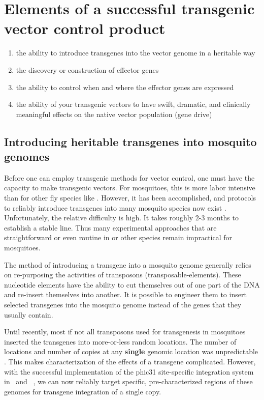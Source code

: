 \section{Elements of a successful transgenic vector control product}

\begin{enumerate}
  \item the ability to introduce transgenes into the vector genome in a heritable way
  \item the discovery or construction of effector genes
  \item the ability to control when and where the effector genes are expressed
  \item the ability of your transgenic vectors to have swift, dramatic, and clinically meaningful effects on the native vector population (gene drive)
\end{enumerate}



\subsection{Introducing heritable transgenes into mosquito genomes}

Before one can employ transgenic methods for vector control, one must have the capacity to make transgenic vectors.
For mosquitoes, this is more labor intensive than for other fly species like \Dmel.
However, it has been accomplished, and protocols to reliably introduce transgenes into many mosquito species now exist \CITEME.
Unfortunately, the relative difficulty is high.
It takes roughly 2-3 months to establish a stable line.
Thus many experimental approaches that are straightforward or even routine in \Dm or other species remain impractical for mosquitoes.

The method of introducing a \gls{transgene} into a mosquito genome generally relies on re-purposing the activities of \glspl{transposon} (\glspl{transposable-element}).
These nucleotide elements have the ability to cut themselves out of one part of the DNA and re-insert themselves into another.
It is possible to engineer them to insert selected transgenes into the mosquito genome instead of the genes that they usually contain.


Until recently, most if not all transposons used for transgenesis in mosquitoes inserted the transgenes into more-or-less random locations.
The number of locations and number of copies at any \textbf{single} genomic location was unpredictable \cite{Adelman2004,Sethuraman2007}.
This makes characterization of the effects of a transgene complicated.
However, with the successful implementation of the \gls{phic31} site-specific integration system in \Aa\ and \As\ \cite{Thorpe1998,Nimmo2006,Isaacs2012}, we can now reliably target specific, pre-characterized regions of these genomes for transgene integration of a single copy.


